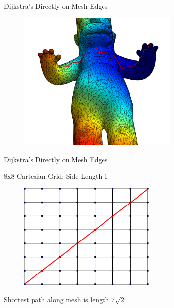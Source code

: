 \documentclass{beamer}
\begin{document}
\begin{frame}{Dijkstra's Directly on Mesh Edges}

\begin{figure}[t]
    \includegraphics[width=0.7\textwidth]{HomerDiscreteRFingerLFinger.pdf}
\end{figure}



\end{frame}


\begin{frame}{Dijkstra's Directly on Mesh Edges}

8x8 Cartesian Grid: Side Length 1

\begin{figure}[t]
    \includegraphics[width=0.6\textwidth]{8x8Cartesian.pdf}
\end{figure}

Shortest path along mesh is length $7 \sqrt{2}$

\end{frame}
\end{document}
